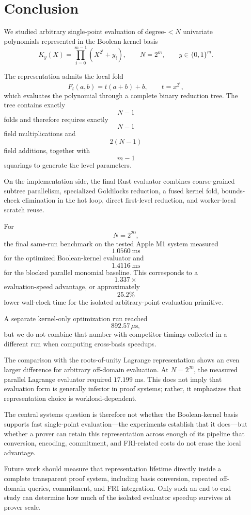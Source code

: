 \section{Conclusion}
\label{sec:conclusion}

We studied arbitrary single-point evaluation of degree-\(<N\) univariate
polynomials represented in the Boolean-kernel basis
\[
K_y(X)
=
\prod_{i=0}^{m-1}
\left(X^{2^i}+y_i\right),
\qquad
N=2^m,
\qquad
y\in\{0,1\}^m.
\]

The representation admits the local fold
\[
F_t(a,b)=t(a+b)+b,
\qquad
t=x^{2^i},
\]
which evaluates the polynomial through a complete binary reduction tree.
The tree contains exactly
\[
N-1
\]
folds and therefore requires exactly
\[
N-1
\]
field multiplications and
\[
2(N-1)
\]
field additions, together with
\[
m-1
\]
squarings to generate the level parameters.

On the implementation side, the final Rust evaluator combines
coarse-grained subtree parallelism, specialized Goldilocks reduction,
a fused kernel fold, bounds-check elimination in the hot loop, direct
first-level reduction, and worker-local scratch reuse.

For
\[
N=2^{20},
\]
the final same-run benchmark on the tested Apple M1 system measured
\[
1.0560\ \mathrm{ms}
\]
for the optimized Boolean-kernel evaluator and
\[
1.4116\ \mathrm{ms}
\]
for the blocked parallel monomial baseline.  This corresponds to a
\[
\boxed{1.337\times}
\]
evaluation-speed advantage, or approximately
\[
\boxed{25.2\%}
\]
lower wall-clock time for the isolated arbitrary-point evaluation
primitive.

A separate kernel-only optimization run reached
\[
892.57\,\mu\mathrm{s},
\]
but we do not combine that number with competitor timings collected in a
different run when computing cross-basis speedups.

The comparison with the roots-of-unity Lagrange representation shows an
even larger difference for arbitrary off-domain evaluation.  At
\(N=2^{20}\), the measured parallel Lagrange evaluator required
\(17.199\) ms.  This does not imply that evaluation form is generally
inferior in proof systems; rather, it emphasizes that representation choice
is workload-dependent.

The central systems question is therefore not whether the Boolean-kernel
basis supports fast single-point evaluation---the experiments establish that
it does---but whether a prover can retain this representation across enough
of its pipeline that conversion, encoding, commitment, and FRI-related
costs do not erase the local advantage.

Future work should measure that representation lifetime directly inside a
complete transparent proof system, including basis conversion, repeated
off-domain queries, commitment, and FRI integration.  Only such an
end-to-end study can determine how much of the isolated evaluator speedup
survives at prover scale.
